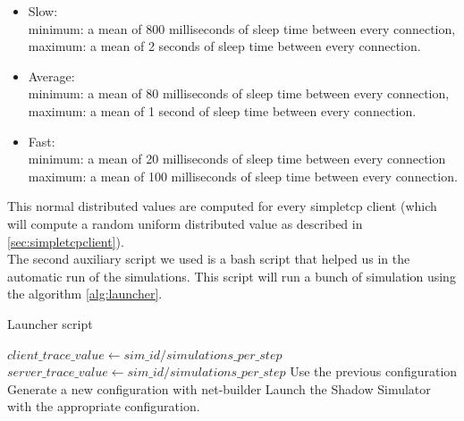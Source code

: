 \begin{itemize}
\item Slow:\\minimum: a mean of 800 milliseconds of sleep time between every connection,\\
            maximum: a mean of 2 seconds of sleep time between every connection.
\item Average:\\minimum: a mean of 80 milliseconds of sleep time between every connection,\\
               maximum: a mean of 1 second of sleep time between every connection.
\item Fast:\\minimum: a mean of 20 milliseconds of sleep time between every connection\\
            maximum: a mean of 100 milliseconds of sleep time between every connection.
\end{itemize}

This normal distributed values are computed for every simpletcp client
(which will compute a random uniform distributed value as described in \ref{sec:simpletcpclient}).\\

The second auxiliary script we used is a bash script that helped us in the
automatic run of the simulations.
This script will run a bunch of simulation using the algorithm \ref{alg:launcher}.

\begin{algorithm}[H]
\caption{Launcher script}
\begin{algorithmic}[2]
			\State $client\_trace\_value \gets sim\_id/simulations\_per\_step$
		\EndIf
			\State $server\_trace\_value \gets sim\_id/simulations\_per\_step$
		\EndIf
			\State Use the previous configuration
		\Else
			\State Generate a new configuration with net-builder
		\EndIf
		\State Launch the Shadow Simulator with the appropriate configuration.
		\EndFor
	\EndFor
\EndFor
\end{algorithmic}
\label{alg:launcher}
\end{algorithm}

